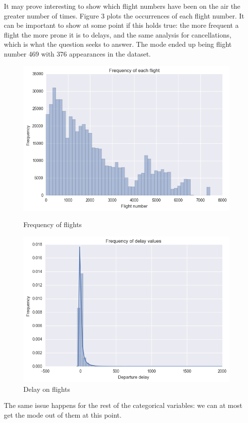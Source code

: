 \documentclass{article}
\begin{document}
    It may prove interesting to show which flight numbers have been on the air the greater number of times. Figure 3 plots the
    occurrences of each flight number. It can be important to show
    at some point if this holds true: the more frequent a flight the more prone it is to delays, and the same analysis for cancellations, which is what the question seeks
    to answer. The mode ended up being flight number 469 with 376 appearances in the dataset.
    \begin{figure}
      \includegraphics[width=\linewidth]{graph/flightnums_freq.png}
      \caption{Frequency of flights}
      \label{fig:graph1}
      \includegraphics[width=\linewidth]{graph/delay_flights.png}
      \caption{Delay on flights}
      \label{fig:graph1}
    \end{figure}
    The same issue happens for the rest of the categorical variables: we can at most get the mode out of them at this point.
\end{document}
